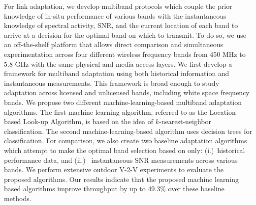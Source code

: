 For link adaptation, we develop multiband protocols 
which couple the prior knowledge of in-situ performance of various bands 
with the instantaneous knowledge of spectral activity, SNR, and the current 
location of each band to arrive at a decision for the optimal band on which to transmit. 
To do so, we use an off-the-shelf platform that allows direct comparison and 
simultaneous experimentation across four different wireless frequency bands 
from 450 MHz to 5.8 GHz with the same physical and media access layers. 
We first develop a framework for multiband adaptation using both historical 
information and instantaneous measurements. This framework is broad enough 
to study adaptation across licensed and unlicensed bands, including white 
space frequency bands. We propose two different machine-learning-based 
multiband adaptation algorithms. The first machine learning algorithm, 
referred to as the Location-based Look-up Algorithm, is based on the idea 
of $k$-nearest-neighbor classification. The second machine-learning-based 
algorithm uses decision trees for classification. For comparison, we also 
create two baseline adaptation algorithms which attempt to make the optimal
band selection based on only: (i.)~historical performance data, and (ii.)
~instantaneous SNR measurements across various bands. We perform extensive 
outdoor V-2-V experiments to evaluate the proposed algorithms. Our results 
indicate that the proposed machine learning based algorithms improve throughput 
by up to $49.3\%$ over these baseline methods.

